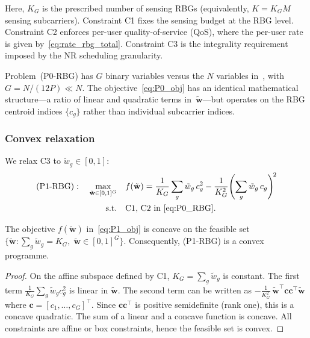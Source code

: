 Here, $K_G$ is the prescribed number of sensing RBGs (equivalently, $K = K_G M$ sensing subcarriers).
Constraint C1 fixes the sensing budget at the RBG level.
Constraint C2 enforces per-user quality-of-service (QoS), where the per-user rate is given by~\eqref{eq:rate_rbg_total}.
Constraint C3 is the integrality requirement imposed by the NR scheduling granularity.

\begin{remark}
\label{rmk:relationship}
Problem~(P0-RBG) has $G$ binary variables versus the $N$ variables in~\cite{ldsa}, with $G = N/(12P) \ll N$.
The objective~\eqref{eq:P0_obj} has an identical mathematical structure---a ratio of linear and quadratic terms in~$\tilde{\mathbf{w}}$---but operates on the RBG centroid indices $\{c_g\}$ rather than individual subcarrier indices.
\end{remark}

\subsubsection{Convex relaxation}
We relax C3 to $\tilde{w}_g \in [0, 1]$:
\begin{subequations}\label{eq:P1_RBG}
\begin{align}
  (\text{P1-RBG}): \quad \max_{\tilde{\mathbf{w}} \in [0,1]^G} \quad
    & f(\tilde{\mathbf{w}}) = \frac{1}{K_G}\sum_{g} \tilde{w}_g\, c_g^2
      - \frac{1}{K_G^2}\!\left(\sum_{g} \tilde{w}_g\, c_g\right)^{\!2}
    \label{eq:P1_obj} \\
  \text{s.t.} \quad
    & \text{C1, C2 in~\eqref{eq:P0_RBG}}.
    \label{eq:P1_constraints}
\end{align}
\end{subequations}

\begin{proposition}
\label{prop:concavity}
The objective $f(\tilde{\mathbf{w}})$ in~\eqref{eq:P1_obj} is concave on the feasible set $\{\tilde{\mathbf{w}} : \sum_g \tilde{w}_g = K_G,\; \tilde{\mathbf{w}} \in [0,1]^G\}$.
Consequently, (P1-RBG) is a convex programme.
\end{proposition}

\begin{proof}
On the affine subspace defined by C1, $K_G = \sum_g \tilde{w}_g$ is constant.
The first term $\frac{1}{K_G}\sum_g \tilde{w}_g c_g^2$ is linear in $\tilde{\mathbf{w}}$.
The second term can be written as $-\frac{1}{K_G^2}\, \tilde{\mathbf{w}}^\top \mathbf{c}\mathbf{c}^\top \tilde{\mathbf{w}}$ where $\mathbf{c} = [c_1, \ldots, c_G]^\top$.
Since $\mathbf{c}\mathbf{c}^\top$ is positive semidefinite (rank one), this is a concave quadratic.
The sum of a linear and a concave function is concave.
All constraints are affine or box constraints, hence the feasible set is convex.
\end{proof}

